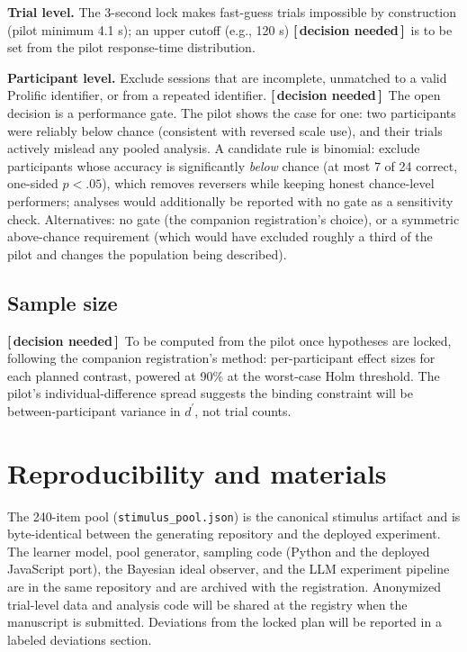 \documentclass[11pt]{article}
\newcommand{\decflag}{{\small\textbf{\textcolor{decisioncol}{[\,decision needed\,]}}}\ }
\newcommand{\dpr}{d^{\prime}}
\begin{document}
\textbf{Trial level.} The 3-second lock makes fast-guess trials impossible by construction
(pilot minimum 4.1 s); an upper cutoff (e.g., 120 s) \decflag is to be set from the pilot
response-time distribution.

\smallskip
\textbf{Participant level.} Exclude sessions that are incomplete, unmatched to a valid
Prolific identifier, or from a repeated identifier. \decflag The open decision is a
performance gate. The pilot shows the case for one: two participants were reliably below
chance (consistent with reversed scale use), and their trials actively mislead any pooled
analysis. A candidate rule is binomial: exclude participants whose accuracy is significantly
\emph{below} chance (at most 7 of 24 correct, one-sided $p < .05$), which removes reversers
while keeping honest chance-level performers; analyses would additionally be reported with no
gate as a sensitivity check. Alternatives: no gate (the companion registration's choice), or
a symmetric above-chance requirement (which would have excluded roughly a third of the pilot
and changes the population being described).

\subsection{Sample size}\label{sec:power}

\decflag To be computed from the pilot once hypotheses are locked, following the companion
registration's method: per-participant effect sizes for each planned contrast, powered at
90\% at the worst-case Holm threshold. The pilot's individual-difference spread suggests the
binding constraint will be between-participant variance in $\dpr$, not trial counts.

\section{Reproducibility and materials}\label{sec:repro}

The 240-item pool (\texttt{stimulus\_pool.json}) is the canonical stimulus artifact and is
byte-identical between the generating repository and the deployed experiment. The learner
model, pool generator, sampling code (Python and the deployed JavaScript port), the Bayesian
ideal observer, and the LLM experiment pipeline are in the same repository and are archived
with the registration. Anonymized trial-level data and analysis code will be shared at the
registry when the manuscript is submitted. Deviations from the locked plan will be reported in
a labeled deviations section.
\end{document}
